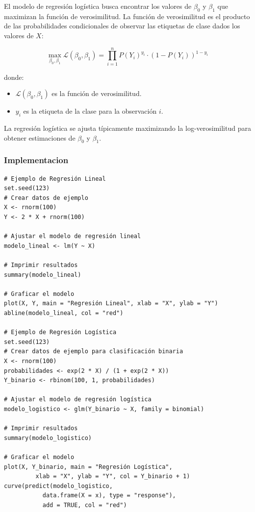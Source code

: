 \documentclass[12pt]{article}
\begin{document}
El modelo de regresión logística busca encontrar los valores de \(\beta_0\) y \(\beta_1\) que maximizan la función de verosimilitud. La función de verosimilitud es el producto de las probabilidades condicionales de observar las etiquetas de clase dados los valores de \(X\):

\[
\max_{\beta_0, \beta_1} \mathcal{L}(\beta_0, \beta_1) = \prod_{i=1}^{n} P(Y_i)^{y_i} \cdot (1 - P(Y_i))^{1 - y_i}
\]

donde:
\begin{itemize}
    \item \(\mathcal{L}(\beta_0, \beta_1)\) es la función de verosimilitud.
    \item \(y_i\) es la etiqueta de la clase para la observación \(i\).
\end{itemize}

La regresión logística se ajusta típicamente maximizando la log-verosimilitud para obtener estimaciones de \(\beta_0\) y \(\beta_1\).

\subsubsection{Implementacion}
\begin{verbatim}
# Ejemplo de Regresión Lineal
set.seed(123)
# Crear datos de ejemplo
X <- rnorm(100)
Y <- 2 * X + rnorm(100)

# Ajustar el modelo de regresión lineal
modelo_lineal <- lm(Y ~ X)

# Imprimir resultados
summary(modelo_lineal)

# Graficar el modelo
plot(X, Y, main = "Regresión Lineal", xlab = "X", ylab = "Y")
abline(modelo_lineal, col = "red")

# Ejemplo de Regresión Logística
set.seed(123)
# Crear datos de ejemplo para clasificación binaria
X <- rnorm(100)
probabilidades <- exp(2 * X) / (1 + exp(2 * X))
Y_binario <- rbinom(100, 1, probabilidades)

# Ajustar el modelo de regresión logística
modelo_logistico <- glm(Y_binario ~ X, family = binomial)

# Imprimir resultados
summary(modelo_logistico)

# Graficar el modelo
plot(X, Y_binario, main = "Regresión Logística", 
         xlab = "X", ylab = "Y", col = Y_binario + 1)
curve(predict(modelo_logistico, 
           data.frame(X = x), type = "response"), 
           add = TRUE, col = "red")
\end{verbatim}
\end{document}
